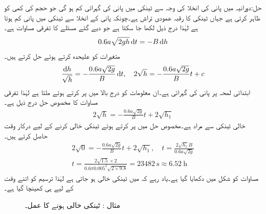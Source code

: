 حل:دورانیہ  میں پانی کی انخلا کی وجہ سے ٹینکی میں پانی کی گہرائی  کم ہو گی جو  حجم کی کمی کو ظاہر کرتی ہے جہاں  ٹینکی کا رقبہ عمودی تراش ہے۔چونکہ پانی کے انخلا سے ٹینکی میں پانی کم ہوتا ہے لہٰذا درج ذیل لکھا جا سکتا ہے جو دیے گئے مسئلے کا تفرقی مساوات ہے۔
\begin{align}
0.6a\sqrt{2gh} \dif t=-B\dif h
\end{align}
متغیرات کو علیحدہ کرتے ہوئے حل کرتے ہیں۔
\begin{align*}
\frac{\dif h}{\sqrt{h}}=-\frac{0.6a \sqrt{2g}}{B} \dif t,\quad 2\sqrt{h}=-\frac{0.6a \sqrt{2g}}{B} t+c
\end{align*}
ابتدائی لمحہ  پر پانی کی گہرائی  ہے۔ان معلومات کو درج بالا میں پر کرتے ہوئے  ملتا ہے لہٰذا تفرقی مساوات کا مخصوص حل درج ذیل ہے۔
\begin{align}\label{مساوات_سادہ_اول_ٹاری_سلی_ٹینکی_خالی}
 2\sqrt{h}=-\frac{0.6a \sqrt{2g}}{B} t+ 2\sqrt{h_1}
\end{align}
خالی ٹینکی سے مراد  ہے۔مخصوص حل میں  پر کرتے ہوئے ٹینکی خالی کرنے کے لیے درکار وقت حاصل کرتے ہیں۔
\begin{align*}
 2\sqrt{0}=-\frac{0.6a \sqrt{2g}}{B} t+ 2\sqrt{h_1}, \quad t=\frac{2\sqrt{h_1} B}{0.6a \sqrt{2g}}\\
t=\frac{2\sqrt{1.5} \times 2}{0.6\pi 0.005^2 \sqrt{2\times 9.8}}=\SI{23482}{\second} \approx \SI{6.52}{\hour}
\end{align*}
مساوات  کو شکل  میں دکھایا گیا ہے۔یاد رہے کہ  میں ٹینکی خالی ہو جاتی ہے لہٰذا ترسیم کو اتنے وقت کے لیے ہی کھینچا گیا ہے۔
\begin{figure}
\centering
{}
\caption{مثال : ٹینکی خالی ہونے کا عمل۔}
\label{شکل_مثال_سادہ_اول_ٹاری_سلی_خالی}
\end{figure}

